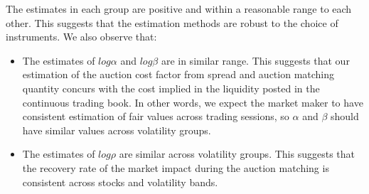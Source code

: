 The estimates in each group are positive and within a reasonable range to each other. This suggests that the estimation methods are robust to the choice of instruments. We also observe that:
\begin{itemize}
  \item The estimates of $log \alpha$ and $log \beta$ are in similar range. This suggests that our estimation of the auction cost factor from spread and auction matching quantity concurs with the cost implied in the liquidity posted in the continuous trading book. In other words, we expect the market maker to have consistent estimation of fair values across trading sessions, so $\alpha$ and $\beta$ should have similar values across volatility groups.
  \item The estimates of $log \rho$ are similar across volatility groups. This suggests that the recovery rate of the market impact during the auction matching is consistent across stocks and volatility bands.
\end{itemize}



